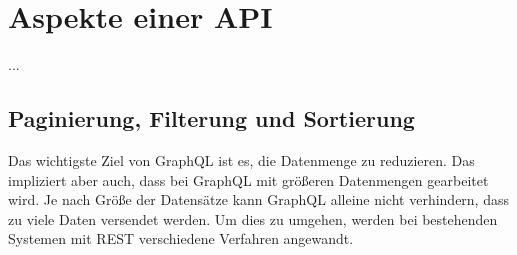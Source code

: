 \chapter{Aspekte einer API}

...

\section{Paginierung, Filterung und Sortierung}

Das wichtigste Ziel von GraphQL ist es, die Datenmenge zu reduzieren. Das impliziert aber auch, dass bei GraphQL mit größeren Datenmengen gearbeitet wird. Je nach Größe der Datensätze kann GraphQL alleine nicht verhindern, dass zu viele Daten versendet werden. Um dies zu umgehen, werden bei bestehenden Systemen mit REST verschiedene Verfahren angewandt. 





